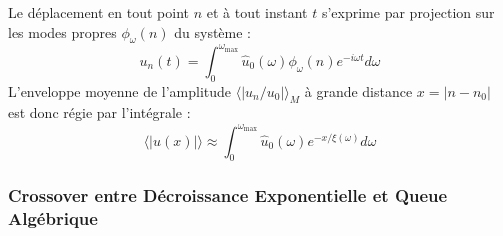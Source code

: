 \documentclass[11pt,a4paper]{article}
\begin{document}
Le déplacement en tout point $n$ et à tout instant $t$ s'exprime par projection sur les modes propres $\phi_\omega(n)$ du système :
\begin{equation}
    u_n(t) = \int_{0}^{\omega_{\text{max}}} \hat{u}_0(\omega) \phi_\omega(n) e^{-i\omega t} d\omega
\end{equation}
L'enveloppe moyenne de l'amplitude $\langle |u_n/u_0| \rangle_M$ à grande distance $x = |n - n_0|$ est donc régie par l'intégrale :
\begin{equation}
    \langle |u(x)| \rangle \approx \int_{0}^{\omega_{\text{max}}} \hat{u}_0(\omega) e^{-x/\xi(\omega)} d\omega
\end{equation}

\subsubsection{Crossover entre Décroissance Exponentielle et Queue Algébrique}
\end{document}
